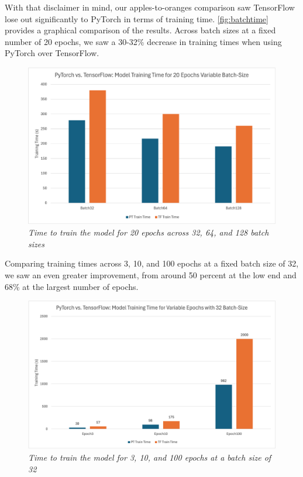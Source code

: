 \documentclass[letterpaper,twocolumn,10pt]{article}
\begin{document}
With that disclaimer in mind, our apples-to-oranges comparison saw TensorFlow lose out significantly to PyTorch in terms of training time. \autoref{fig:batchtime} provides a graphical comparison of the results. Across batch sizes at a fixed number of 20 epochs, we saw a 30-32\% decrease in training times when using PyTorch over TensorFlow.

\begin{figure}[ht]
    \centering
    \includegraphics[width=1.0\linewidth]{Figures/batch_time.png}
    \caption{\textit{Time to train the model for 20 epochs across 32, 64, and 128 batch sizes}}
    \label{fig:batchtime}
\end{figure}

Comparing training times across 3, 10, and 100 epochs at a fixed batch size of 32, we saw an even greater improvement, from around 50 percent at the low end and 68\% at the largest number of epochs.

\begin{figure}[ht]
    \centering
    \includegraphics[width=1.0\linewidth]{Figures/epoch_time.png}
    \caption{\textit{Time to train the model for 3, 10, and 100 epochs at a batch size of 32}}
    \label{fig:epochtime}
\end{figure}
\end{document}
